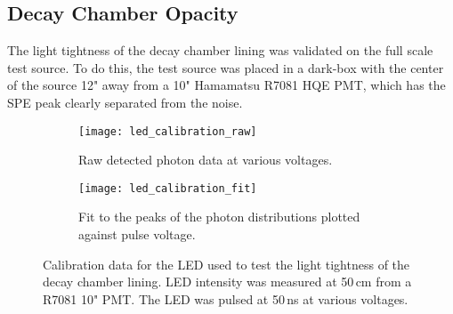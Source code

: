 \subsection{Decay Chamber Opacity}
\label{sec:liningtest}
The light tightness of the decay chamber lining was validated on the full scale test source. 
To do this, the test source was placed in a dark-box with the center of the source 12" away from a 10" Hamamatsu R7081 HQE PMT, which has the SPE peak clearly separated from the noise. 
\begin{figure}
        \begin{subfigure}{0.49\textwidth}
                \texttt{[image: led\_calibration\_raw]}
                \caption{Raw detected photon data at various voltages.}
                \label{fig:ledRAW}
        \end{subfigure}%
        \hspace{0.2cm}
        \begin{subfigure}{0.49\textwidth}
                \texttt{[image: led\_calibration\_fit]}
                \caption{Fit to the peaks of the photon distributions plotted against pulse voltage.}
                \label{fig:ledFit}
        \end{subfigure}
        \caption{Calibration data for the LED used to test the light tightness of the decay chamber lining. LED intensity was measured at 50\,cm from a R7081 10" PMT. The LED was pulsed at 50\,ns at various voltages.}
\label{fig:calibratedled1}
\end{figure}

